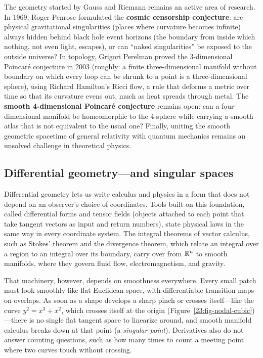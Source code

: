 \begin{historybox}
The geometry started by Gauss and Riemann remains an active area of research. In 1969, Roger Penrose formulated the \textbf{cosmic censorship conjecture}: are physical gravitational singularities (places where curvature becomes infinite) always hidden behind black hole event horizons (the boundary from inside which nothing, not even light, escapes), or can ``naked singularities'' be exposed to the outside universe? In topology, Grigori Perelman proved the 3-dimensional Poincar\'e conjecture in 2003 (roughly: a finite three-dimensional manifold without boundary on which every loop can be shrunk to a point is a three-dimensional sphere), using Richard Hamilton's Ricci flow, a rule that deforms a metric over time so that its curvature evens out, much as heat spreads through metal. The \textbf{smooth 4-dimensional Poincar\'e conjecture} remains open: can a four-dimensional manifold be homeomorphic to the 4-sphere while carrying a smooth atlas that is not equivalent to the usual one? Finally, uniting the smooth geometric spacetime of general relativity with quantum mechanics remains an unsolved challenge in theoretical physics.
\end{historybox}

\subsection{Differential geometry---and singular spaces}

Differential geometry lets us write calculus and physics in a form that does not depend on an observer's choice of coordinates. Tools built on this foundation, called differential forms and tensor fields (objects attached to each point that take tangent vectors as input and return numbers), state physical laws in the same way in every coordinate system. The integral theorems of vector calculus, such as Stokes' theorem and the divergence theorem, which relate an integral over a region to an integral over its boundary, carry over from $\mathbb{R}^n$ to smooth manifolds, where they govern fluid flow, electromagnetism, and gravity.

That machinery, however, depends on smoothness everywhere. Every small patch must look smoothly like flat Euclidean space, with differentiable transition maps on overlaps. As soon as a shape develops a sharp pinch or crosses itself---like the curve $y^2 = x^3 + x^2$, which crosses itself at the origin (Figure~\ref{23:fig-nodal-cubic})---there is no single flat tangent space to linearize around, and smooth manifold calculus breaks down at that point (a \emph{singular point}). Derivatives also do not answer counting questions, such as how many times to count a meeting point where two curves touch without crossing.

